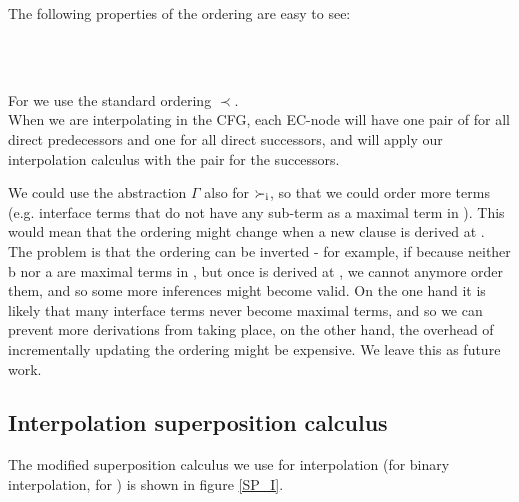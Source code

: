 \noindent
The following properties of the ordering are easy to see:
\begin{lemma}
\\
\\
\label{lemma_succ_i}
\end{lemma}

\noindent
For  we use the standard ordering $\prec$.\\
When we are interpolating in the CFG, each EC-node will have one pair of  for all direct predecessors and one for all direct successors,
and will apply our interpolation calculus  with the pair for the successors.

\noindent
We could use the abstraction $\Gamma$ also for $\succ_{\mathrm{i}}$, so that we could order more terms (e.g. interface terms that do not have any sub-term as a maximal term in ). This would mean that the ordering might change when a new clause is derived at .\\
The problem is that the ordering can be inverted  - for example, if  because neither b nor a are maximal terms in ,
but once  is derived at , we cannot anymore order them, and so some more inferences might become valid.
On the one hand it is likely that many interface terms never become maximal terms, and so we can prevent more derivations from taking place, on the other hand, the overhead of incrementally updating the ordering might be expensive. We leave this as future work.

\subsection{Interpolation superposition calculus}
The modified superposition calculus we use for interpolation (for binary interpolation, for ) is shown in figure \ref{SP_I}.

